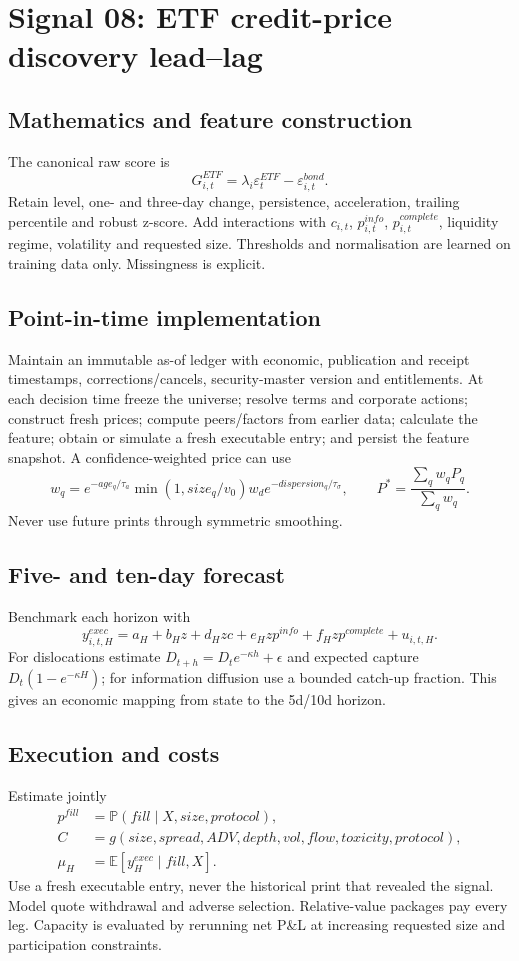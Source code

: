 \documentclass[10pt]{article}
\newcommand{\E}{\mathbb{E}}\newcommand{\Pp}{\mathbb{P}}
\begin{document}
\section{Signal 08: ETF credit-price discovery lead--lag}
\subsection{Mathematics and feature construction}
The canonical raw score is
\begin{equation}G^{ETF}_{i,t}=\lambda_i\varepsilon^{ETF}_t-\varepsilon^{bond}_{i,t}.\end{equation}
Retain level, one- and three-day change, persistence, acceleration, trailing percentile and robust z-score. Add interactions with $c_{i,t}$, $p^{info}_{i,t}$, $p^{complete}_{i,t}$, liquidity regime, volatility and requested size. Thresholds and normalisation are learned on training data only. Missingness is explicit.

\subsection{Point-in-time implementation}
Maintain an immutable as-of ledger with economic, publication and receipt timestamps, corrections/cancels, security-master version and entitlements. At each decision time freeze the universe; resolve terms and corporate actions; construct fresh prices; compute peers/factors from earlier data; calculate the feature; obtain or simulate a fresh executable entry; and persist the feature snapshot. A confidence-weighted price can use
\[w_q=e^{-age_q/\tau_a}\min(1,size_q/v_0)w_d e^{-dispersion_q/\tau_\sigma},\qquad P^*=\frac{\sum_qw_qP_q}{\sum_qw_q}.\]
Never use future prints through symmetric smoothing.

\subsection{Five- and ten-day forecast}
Benchmark each horizon with
\[y^{exec}_{i,t,H}=a_H+b_Hz+d_Hzc+e_Hzp^{info}+f_Hzp^{complete}+u_{i,t,H}.\]
For dislocations estimate $D_{t+h}=D_te^{-\kappa h}+\epsilon$ and expected capture $D_t(1-e^{-\kappa H})$; for information diffusion use a bounded catch-up fraction. This gives an economic mapping from state to the 5d/10d horizon.

\subsection{Execution and costs}
Estimate jointly
\begin{align}
p^{fill}&=\Pp(fill\mid X,size,protocol),\\
C&=g(size,spread,ADV,depth,vol,flow,toxicity,protocol),\\
\mu_H&=\E[y^{exec}_H\mid fill,X].
\end{align}
Use a fresh executable entry, never the historical print that revealed the signal. Model quote withdrawal and adverse selection. Relative-value packages pay every leg. Capacity is evaluated by rerunning net P\&L at increasing requested size and participation constraints.
\end{document}
